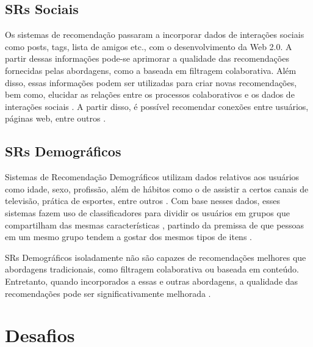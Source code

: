     \subsection{SRs Sociais}
    
    Os sistemas de recomendação passaram a incorporar dados de interações sociais como posts, tags, lista de amigos etc., com o desenvolvimento da Web 2.0. A partir dessas informações pode-se aprimorar a qualidade das recomendações fornecidas pelas abordagens, como a baseada em filtragem colaborativa. Além disso, essas informações podem ser utilizadas para criar novas recomendações, bem como, elucidar as relações entre os processos colaborativos e os dados de interações sociais \cite{Bobadilla_2013}. A partir disso, é possível recomendar conexões entre usuários, páginas web, entre outros \cite{Aggarwal2016}.
    
    
    \subsection{SRs Demográficos}
    
    Sistemas de Recomendação Demográficos utilizam dados relativos aos usuários como idade, sexo, profissão, além de hábitos como o de assistir a certos canais de televisão, prática de esportes, entre outros \cite{Krulwich1997}. Com base nesses dados, esses sistemas fazem uso de classificadores para dividir os usuários em grupos que compartilham das mesmas características \cite{Aggarwal2016}, partindo da premissa de que pessoas em um mesmo grupo tendem a gostar dos mesmos tipos de itens \cite{Pazzani1999}. 
   
    SRs Demográficos isoladamente não são capazes de recomendações melhores que abordagens tradicionais, como filtragem colaborativa ou baseada em conteúdo. Entretanto, quando incorporados a essas e outras abordagens, a qualidade das recomendações pode ser  significativamente melhorada \cite{Aggarwal2016}. 

    


\section{Desafios} \label{sec:desafios}

    
